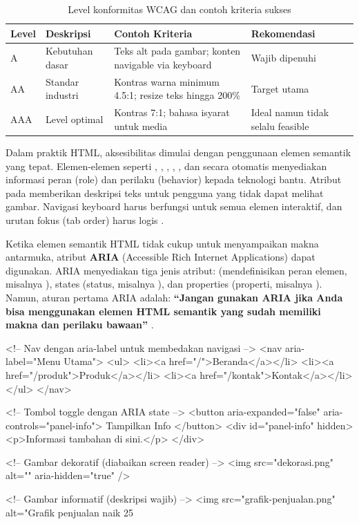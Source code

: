 \begin{table}[H]
\centering
\begin{tabular}{|P{1.5cm}|P{3.5cm}|P{3.5cm}|P{3.5cm}|}
\hline
\textbf{Level} & \textbf{Deskripsi} & \textbf{Contoh Kriteria} & \textbf{Rekomendasi} \\
\hline
A & Kebutuhan dasar & Teks alt pada gambar; konten navigable via keyboard & Wajib dipenuhi \\
\hline
AA & Standar industri & Kontras warna minimum 4.5:1; resize teks hingga 200\% & Target utama \\
\hline
AAA & Level optimal & Kontras 7:1; bahasa isyarat untuk media & Ideal namun tidak selalu feasible \\
\hline
\end{tabular}
\caption{Level konformitas WCAG dan contoh kriteria sukses}
\end{table}

Dalam praktik HTML, aksesibilitas dimulai dengan penggunaan elemen semantik yang tepat. Elemen-elemen seperti , , , , , dan  secara otomatis menyediakan informasi peran (role) dan perilaku (behavior) kepada teknologi bantu. Atribut  pada  memberikan deskripsi teks untuk pengguna yang tidak dapat melihat gambar. Navigasi keyboard harus berfungsi untuk semua elemen interaktif, dan urutan fokus (tab order) harus logis \cite{webdevAccessibility}.

Ketika elemen semantik HTML tidak cukup untuk menyampaikan makna antarmuka, atribut \textbf{ARIA} (Accessible Rich Internet Applications) dapat digunakan. ARIA menyediakan tiga jenis atribut:  (mendefinisikan peran elemen, misalnya ),  states (status, misalnya ), dan  properties (properti, misalnya ). Namun, aturan pertama ARIA adalah: \textbf{``Jangan gunakan ARIA jika Anda bisa menggunakan elemen HTML semantik yang sudah memiliki makna dan perilaku bawaan''} \cite{mdnAccessibility}.

\begin{webcode}[language=HTML, caption={Contoh penggunaan ARIA untuk navigasi dan tombol}]
<!-- Nav dengan aria-label untuk membedakan navigasi -->
<nav aria-label="Menu Utama">
  <ul>
    <li><a href="/">Beranda</a></li>
    <li><a href="/produk">Produk</a></li>
    <li><a href="/kontak">Kontak</a></li>
  </ul>
</nav>

<!-- Tombol toggle dengan ARIA state -->
<button aria-expanded="false"
        aria-controls="panel-info">
  Tampilkan Info
</button>
<div id="panel-info" hidden>
  <p>Informasi tambahan di sini.</p>
</div>

<!-- Gambar dekoratif (diabaikan screen reader) -->
<img src="dekorasi.png" alt="" aria-hidden="true" />

<!-- Gambar informatif (deskripsi wajib) -->
<img src="grafik-penjualan.png"
     alt="Grafik penjualan naik 25%
\end{webcode}

